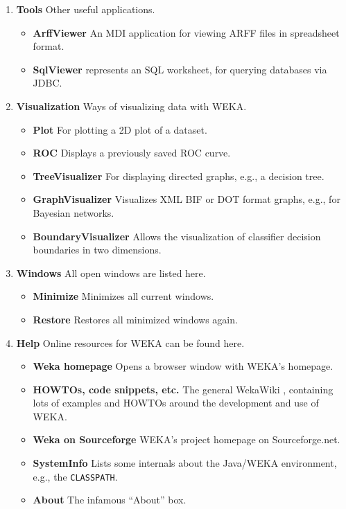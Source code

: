\begin{enumerate}
	\item \textbf{Tools} Other useful applications. \\
		\begin{itemize}
			\item \textbf{ArffViewer} An MDI application for viewing ARFF files in spreadsheet format.
			\item \textbf{SqlViewer} represents an SQL worksheet, for querying databases via JDBC.
		\end{itemize}
		
	\item \textbf{Visualization} Ways of visualizing data with WEKA. \\
		\begin{itemize}
			\item \textbf{Plot} For plotting a 2D plot of a dataset.
			\item \textbf{ROC} Displays a previously saved ROC curve.
			\item \textbf{TreeVisualizer} For displaying directed graphs, e.g., a decision tree.
			\item \textbf{GraphVisualizer} Visualizes XML BIF or DOT format graphs, e.g., for Bayesian networks.
			\item \textbf{BoundaryVisualizer} Allows the visualization of classifier decision boundaries in two dimensions.
		\end{itemize}
		
	\item \textbf{Windows} All open windows are listed here. \\
		\begin{itemize}
			\item \textbf{Minimize} Minimizes all current windows.
			\item \textbf{Restore} Restores all minimized windows again.
		\end{itemize}
		
	\item \textbf{Help} Online resources for WEKA can be found here. \\
		\begin{itemize}
			\item \textbf{Weka homepage} Opens a browser window with WEKA's homepage.
			\item \textbf{HOWTOs, code snippets, etc.} The general WekaWiki \cite{wekawiki}, containing lots of examples and HOWTOs around the development and use of WEKA.
			\item \textbf{Weka on Sourceforge} WEKA's project homepage on Sourceforge.net.
			\item \textbf{SystemInfo} Lists some internals about the Java/WEKA environment, e.g., the \texttt{CLASSPATH}.
			\item \textbf{About} The infamous ``About'' box.
		\end{itemize}
\end{enumerate}


